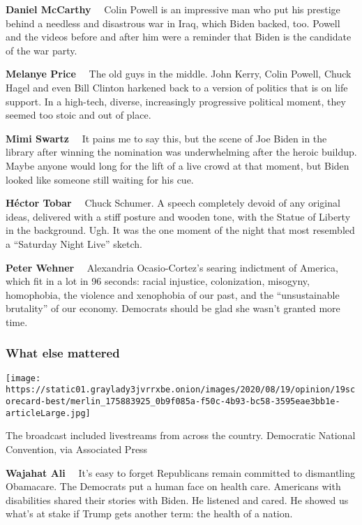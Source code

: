 \textbf{Daniel McCarthy}~~ Colin Powell is an impressive man who put his
prestige behind a needless and disastrous war in Iraq, which Biden
backed, too. Powell and the videos before and after him were a reminder
that Biden is the candidate of the war party.

\textbf{Melanye Price}~~ The old guys in the middle. John Kerry, Colin
Powell, Chuck Hagel and even Bill Clinton harkened back to a version of
politics that is on life support. In a high-tech, diverse, increasingly
progressive political moment, they seemed too stoic and out of place.

\textbf{Mimi Swartz}~~ It pains me to say this, but the scene of Joe
Biden in the library after winning the nomination was underwhelming
after the heroic buildup. Maybe anyone would long for the lift of a live
crowd at that moment, but Biden looked like someone still waiting for
his cue.

\textbf{Héctor Tobar}~~ Chuck Schumer. A speech completely devoid of any
original ideas, delivered with a stiff posture and wooden tone, with the
Statue of Liberty in the background. Ugh. It was the one moment of the
night that most resembled a ``Saturday Night Live'' sketch.

\textbf{Peter Wehner}~~ Alexandria Ocasio-Cortez's searing indictment of
America, which fit in a lot in 96 seconds: racial injustice,
colonization, misogyny, homophobia, the violence and xenophobia of our
past, and the ``unsustainable brutality'' of our economy. Democrats
should be glad she wasn't granted more time.

\hypertarget{what-else-mattered}{%
\subsubsection{What else mattered}\label{what-else-mattered}}

\texttt{[image: https://static01.graylady3jvrrxbe.onion/images/2020/08/19/opinion/19scorecard-best/merlin\_175883925\_0b9f085a-f50c-4b93-bc58-3595eae3bb1e-articleLarge.jpg]}

The broadcast included livestreams from across the country. Democratic
National Convention, via Associated Press

\textbf{Wajahat Ali}~~ It's easy to forget Republicans remain committed
to dismantling Obamacare. The Democrats put a human face on health care.
Americans with disabilities shared their stories with Biden. He listened
and cared. He showed us what's at stake if Trump gets another term: the
health of a nation.

